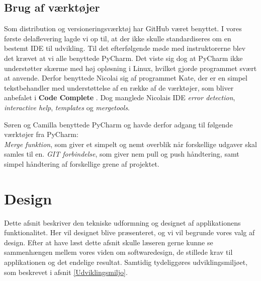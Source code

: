 \documentclass[]{article}
\begin{document}
\subsection{Brug af værktøjer}
Som distribution og versioneringsværktøj har GitHub været benyttet.
I vores første delaflevering lagde vi op til, at der ikke skulle standardiseres om en bestemt IDE til udvikling. Til det efterfølgende møde med instruktorerne blev det krævet at vi alle benyttede PyCharm. Det viste sig dog at PyCharm ikke understøtter skærme med høj opløsning i Linux, hvilket gjorde programmet svært at anvende. Derfor benyttede Nicolai sig af programmet Kate, der er en simpel tekstbehandler med understøttelse af en række af de værktøjer, som bliver anbefalet i \textbf{Code Complete} \cite{mcconnell2004code}. Dog manglede Nicolais IDE \textit{error detection}, \textit{interactive help}, \textit{templates} og \textit{mergetools}. 

Søren og Camilla benyttede PyCharm og havde derfor adgang til følgende værktøjer fra PyCharm: \\
\textit{Merge funktion}, som giver et simpelt og nemt overblik når forskellige udgaver skal samles til en. \textit{GIT forbindelse}, som giver nem pull og push håndtering, samt simpel håndtering af forskellige grene af projektet.

\pagebreak[3]

\section{Design} \label{Design}
Dette afsnit beskriver den tekniske udformning og designet af applikationens funktionalitet. Her vil designet blive præsenteret, og vi vil begrunde vores valg af design. Efter at have læst dette afsnit skulle læseren gerne kunne se sammenhængen mellem vores viden om softwaredesign, de stillede krav til applikationen og det endelige resultat. Samtidig tydeliggøres udviklingsmiljøet, som beskrevet i afsnit \ref{Udviklingsmiljo}. \\
\end{document}
